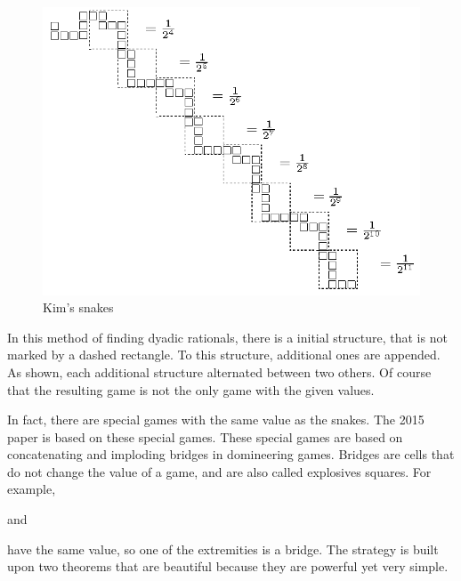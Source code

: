 \hspace{-1cm}
\begin{figure}[H]
	\begin{center}
\includegraphics[scale=0.7]{../images/kims_snakes.png}
\end{center}
\caption{Kim's snakes}
\end{figure}

In this method of finding dyadic rationals, there is a initial structure, that is not marked by a dashed rectangle. To this structure, additional ones are appended. As shown, each additional structure alternated between two others. Of course that the resulting game is not the only game with the given values.

In fact, there are special games with the same value as the snakes. The 2015 paper is based on these special games. These special games are based on concatenating and imploding bridges in domineering games. Bridges are cells that do not change the value of a game, and are also called explosives squares. For example, 
and
have the same value, so one of the extremities is a bridge. The strategy is built upon two theorems that are beautiful because they are powerful yet very simple.

